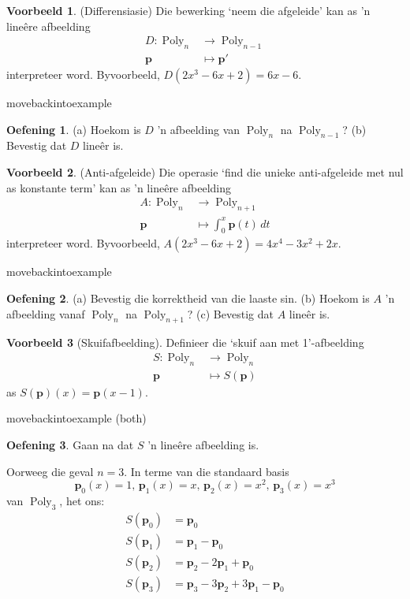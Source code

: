 \documentclass[a4paper,11pt]{book}
\theoremstyle{definition}
\newtheorem{exercise}{Oefening}
\newtheorem{example_environment}{Voorbeeld}[chapter]
\newcommand{\ve}[1]{\mathbf{#1}}
\newenvironment{example}
	{
		\begin{oframed}
		\begin{example_environment}
	}
	{
		\end{example_environment}
		\end{oframed}
	}
\DeclareMathOperator{\Poly}{Poly}
\begin{document}
\begin{example}(Differensiasie) \label{diff_of_poly}Die bewerking `neem die
	afgeleide' kan as 'n line{\^e}re afbeelding
	\begin{align*}
		D : \Poly_n & \rightarrow \Poly_{n-1} \\
		\ve{p} & \mapsto \ve{p}' \, 
	\end{align*}
	interpreteer word. Byvoorbeeld, $D(2x^3 - 6x + 2) = 6x - 6$.
	
\end{example}movebackintoexample
\begin{exercise} 
	(a) Hoekom is $D$ 'n afbeelding van $\Poly_n$ na $\Poly_{n-1}$? (b)
	Bevestig dat $D$ line{\^e}r is.
\end{exercise}
\begin{example}(Anti-afgeleide) Die operasie `find die unieke
	anti-afgeleide met nul as konstante term' kan as 'n line{\^e}re
	afbeelding
	\begin{align*}
		A : \Poly_n & \rightarrow \Poly_{n+1} \\
		\ve{p} & \mapsto \int_0^x \ve{p}(t) \, dt 
	\end{align*}
	interpreteer word. Byvoorbeeld, $A(2x^3 - 6x + 2) = 4 x^4 - 3x^2 + 2x$.
	
\end{example}movebackintoexample
\begin{exercise} (a) Bevestig die korrektheid van die laaste sin. (b)
	Hoekom is $A$ 'n afbeelding vanaf $\Poly_n$ na $\Poly_{n+1}$? (c)
	Bevestig dat $A$ line{\^e}r is.
\end{exercise} 
\begin{example}[Skuifafbeelding] Definieer die `skuif aan met 1'-afbeelding
	\label{shift_example}
	\begin{align*}
		S : \Poly_n & \rightarrow \Poly_n \\
		\ve{p} & \mapsto S( \ve{p})
	\end{align*}
	as $S(\ve{p})(x) = \ve{p}(x-1)$. 
	
\end{example}movebackintoexample (both)
\begin{exercise} Gaan na dat $S$ 'n line{\^e}re afbeelding is.
\end{exercise}
Oorweeg die geval $n=3$. In terme van die standaard basis
\[
\ve{p}_0 (x) = 1, \, \ve{p}_1 (x) = x, \, \ve{p}_2 (x) = x^2, \,
\ve{p}_3 (x) = x^3
\]
van $\Poly_3$, het ons:
\begin{align*}
S(\ve{p}_0) &= \ve{p}_0 \\
S(\ve{p}_1) &= \ve{p}_1 - \ve{p}_0 \\
S(\ve{p}_2) &= \ve{p}_2 - 2 \ve{p}_1 + \ve{p}_0 \\
S(\ve{p}_3) &= \ve{p}_3 - 3 \ve{p}_2 + 3 \ve{p}_1 - \ve{p}_0
\end{align*}
\end{document}
